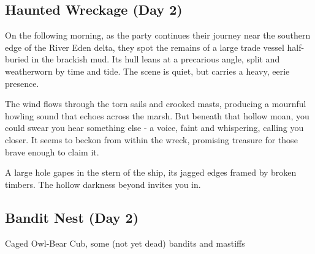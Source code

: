 \subsection*{Haunted Wreckage (Day 2)}
{\entryfont On the following morning, as the party continues their journey near the southern edge of the River Eden delta, they spot the remains of a large trade vessel half-buried in the brackish mud. Its hull leans at a precarious angle, split and weatherworn by time and tide. The scene is quiet, but carries a heavy, eerie presence.}

\begin{DndReadAloud}
	The wind flows through the torn sails and crooked masts, producing a mournful howling sound that echoes across the marsh. But beneath that hollow moan, you could swear you hear something else - a voice, faint and whispering, calling you closer. It seems to beckon from within the wreck, promising treasure for those brave enough to claim it.

	A large hole gapes in the stern of the ship, its jagged edges framed by broken timbers. The hollow darkness beyond invites you in.
\end{DndReadAloud}

\subsection*{Bandit Nest (Day 2)}
Caged Owl-Bear Cub, some (not yet dead) bandits and mastiffs